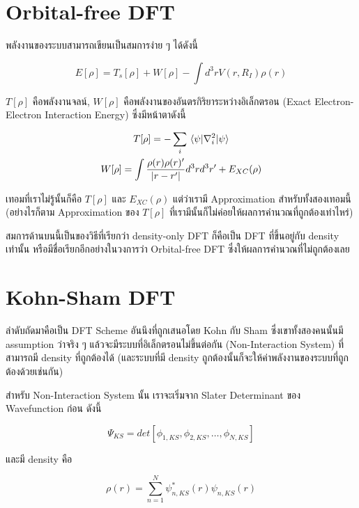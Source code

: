 \section{Orbital-free DFT}

พลังงานของระบบสามารถเขียนเป็นสมการง่าย ๆ ได้ดังนี้

\begin{equation}
    E[\rho] = T_{s}[\rho] + W[\rho] - \int d^{3} r V(r,R_{I}) \rho(r)
\end{equation}

\noindent $T[\rho]$ คือพลังงานจลน์, $W[\rho]$ คือพลังงานของอันตรกิริยาระหว่างอิเล็กตรอน
(Exact Electron-Electron Interaction Energy) ซึ่งมีหน้าตาดังนี้

\begin{gather}
    T[\rho] = -\sum_{i} \mel{\psi}{\nabla^{2}_{i}}{\psi} \\
    W[\rho] = \int \frac{\rho(r)\rho(r)'}{|r-r'|} d^{3} r d^{3} r' + E_{XC}(\rho)
\end{gather}

เทอมที่เราไม่รู้นั้นก็คือ $T[\rho]$ และ  $E_{XC}(\rho)$ แต่ว่าเรามี Approximation สำหรับทั้งสองเทอมนี้
(อย่างไรก็ตาม Approximation ของ $T[\rho]$ ที่เรามีนั้นก็ไม่ค่อยให้ผลการคำนวณที่ถูกต้องเท่าไหร่)

สมการด้านบนนี้เป็นของวิธีที่เรียกว่า density-only DFT ก็คือเป็น DFT ที่ขึ้นอยู่กับ density เท่านั้น
หรือมีชื่อเรียกอีกอย่างในวงการว่า Orbital-free DFT ซึ่งให้ผลการคำนวณที่ไม่ถูกต้องเลย

\section{Kohn-Sham DFT}

ลำดับถัดมาคือเป็น DFT Scheme อันนึงที่ถูกเสนอโดย Kohn กับ Sham ซึ่งเขาทั้งสองคนนั้นมี assumption
ว่าจริง ๆ แล้วจะมีระบบที่อิเล็กตรอนไม่ขึ้นต่อกัน (Non-Interaction System) ที่สามารถมี density
ที่ถูกต้องได้ (และระบบที่มี density ถูกต้องนั้นก็จะให้ค่าพลังงานของระบบที่ถูกต้องด้วยเช่นกัน)

สำหรับ Non-Interaction System นั้น เราจะเริ่มจาก Slater Determinant ของ Wavefunction
ก่อน ดังนี้

\begin{equation}
    \Psi_{KS} = det[\phi_{1,KS}, \phi_{2,KS}, \dots, \phi_{N,KS}]
\end{equation}

\noindent และมี density คือ

\begin{equation}
    \rho(r) = \sum^{N}_{n=1} \psi_{n,KS}^{\ast}(r) \psi_{n,KS}(r)
\end{equation}

